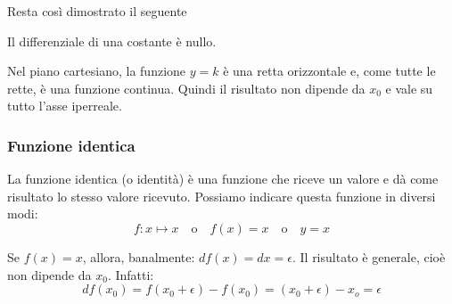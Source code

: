 \begin{inaccessibleblock}
 \begin{center}
 \begin{minipage}[]{.38 \textwidth}
  \diffcostante
 \end{minipage} 
 \hfill
 \begin{minipage}[]{.58 \textwidth}
Resta così dimostrato il seguente   
\begin{teorema}
Il differenziale di una costante è nullo.
\end{teorema}
Nel piano cartesiano, la funzione  $y=k$ è una retta orizzontale e, come 
tutte le rette, è una funzione continua. Quindi il risultato non dipende da 
$x_0$ e vale su tutto l'asse iperreale.
 \end{minipage}
 \end{center}
\end{inaccessibleblock}

\label{fig:diff01_diffcostante}

\subsubsection{Funzione identica}
\label{subsubsec:diff01_diffidentica}

La funzione identica (o identità) è una funzione che riceve un valore e dà 
come risultato lo stesso valore ricevuto. Possiamo indicare questa funzione 
in diversi modi:
\[f: x \mapsto x \quad \text{o} \quad f(x)=x \quad \text{o} \quad y = x\]

Se $f(x)=x$, allora, banalmente: $df(x)=dx=\epsilon$. Il risultato è
generale, cioè non dipende da $x_0$. Infatti:\\
\[df(x_0)=f(x_0+\epsilon)-f(x_0)=(x_0+\epsilon)-x_o=\epsilon\] 

